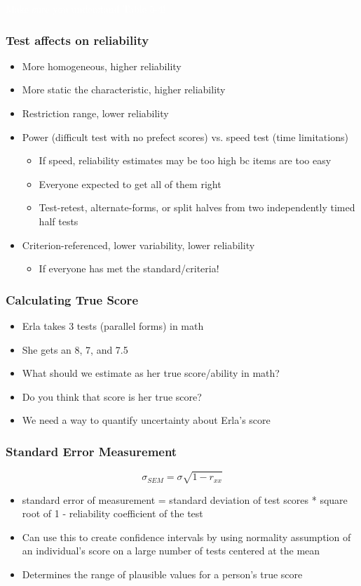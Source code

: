 \documentclass[dvipsnames]{beamer}\usepackage[]{graphicx}\usepackage[]{color}
\begin{document}
{
\begin{frame}
\centering\Huge \textcolor{white}{Make sure you understand Table 5-4!}
\end{frame}
}

\begin{frame}
\frametitle{Test affects on reliability}
\begin{itemize}
\item More homogeneous, higher reliability
\item More static the characteristic, higher reliability
\item Restriction range, lower reliability
\item Power (difficult test with no prefect scores) vs. speed test (time limitations)
  \begin{itemize}
  \item If speed, reliability estimates may be too high bc items are too easy
  \item Everyone expected to get all of them right
  \item Test-retest, alternate-forms, or split halves from two independently timed half tests
  \end{itemize}
\item Criterion-referenced, lower variability, lower reliability
  \begin{itemize}
    \item If everyone has met the standard/criteria!
  \end{itemize}
 \end{itemize}
\end{frame}

\begin{frame}
\frametitle{Calculating True Score}
\begin{itemize}
  \item Erla takes 3 tests (parallel forms) in math
  \item She gets an 8, 7, and 7.5
  \item What should we estimate as her true score/ability in math?
  \item Do you think that score is her true score?
  \item<2-> \textcolor{wared}{We need a way to quantify uncertainty about Erla's score}
\end{itemize}
\end{frame}

\begin{frame}
\frametitle{Standard Error Measurement}
$$\sigma_{SEM} = \sigma\sqrt{1 - r_{xx}}$$
\begin{itemize}
\item standard error of measurement = standard deviation of test scores * square root of 1 - reliability coefficient of the test
  \item<2->Can use this to create confidence intervals by using normality assumption of an individual's score on a large number of tests centered at the mean
  \item<2-> Determines the range of plausible values for a person's true score
\end{itemize}
\end{frame}
\end{document}
